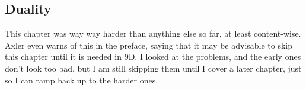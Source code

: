 \subsection{Duality}

This chapter was way way harder than anything else so far, at least content-wise. Axler even warns of this in the preface, saying that it may be advisable to skip this chapter until it is needed in 9D. I looked at the problems, and the early ones don't look too bad, but I am still skipping them until I cover a later chapter, just so I can ramp back up to the harder ones.

